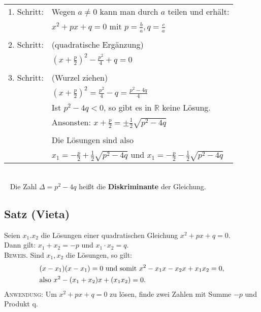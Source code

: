 	\begin{tabular}{@{}ll}
	
	1. Schritt:	& Wegen $a\neq 0$ kann man durch $a$ teilen und erhält: \\
				& $x^2+px+q=0$ mit $p=\frac{b}{a}, q=\frac{c}{a}$ \\
				&\\
	2. Schritt:	& (quadratische Ergänzung) \\
				& $\left( x+\frac{p}{2}\right) ^2 - \frac{p^2}{4}+q=0$ \\
				&\\
	3. Schritt:	& (Wurzel ziehen) \\
				& $\left( x+\frac{p}{2}\right) ^2 = \frac{p^2}{4}-q=\frac{p^2-4q}{4}$ \\
				& Ist $p^2-4q <0$, so gibt es in $\mathbb{R}$ keine Lösung. \\
				& Ansonsten: $x+\frac{p}{2}=\pm \frac{1}{2} \sqrt{p^2-4q}$ \\
				&\\
				& Die Lösungen sind also \\
				& $x_1=-\frac{p}{2}+\frac{1}{2}\sqrt{p^2-4q}$ und $x_1=-\frac{p}{2}-\frac{1}{2}\sqrt{p^2-4q}$ 	
	
	\end{tabular}\\
	 ~\newline\newline
	Die Zahl $\Delta=p^2-4q$ heißt die \textbf{Diskriminante} der Gleichung.
	
	

\subsection[Satz von Vieta]{Satz (Vieta)}\hypertarget{vieta}{}

	Seien $x_1.x_2$ die Lösungen einer quadratischen Gleichung $x^2+px+q=0$.\\
	Dann gilt: $x_1+x_2=-p$ und $x_1 \cdot x_2=q$.\\ \newline
	\textsc{Beweis.} Sind $x_1, x_2$ die Lösungen, so gilt:
	\begin{align*}
	&(x-x_1)(x-x_1)=0 \textnormal{ und somit } x^2-x_1 x-x_2 x+x_1 x_2=0,\\
	&\textnormal{also } x^2-(x_1 + x_2)x+(x_1 x_2)=0.
	\end{align*}
	\newline 
	\textsc{Anwendung:} Um $x^2+px+q=0$ zu lösen, finde zwei Zahlen mit Summe $-p$ und Produkt q.
	
